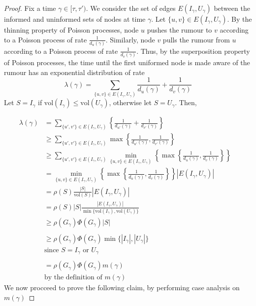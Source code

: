 \begin{proof}
	Fix a time $\gamma \in [\tau, \tau')$. 
	We consider the set of edges $E(I_\gamma, U_\gamma)$ between the informed and uninformed sets of nodes at time $\gamma$. 
	Let $\{u, v\} \in E(I_\gamma, U_\gamma)$. By the thinning property of Poisson processes, node $u$ pushes the rumour to $v$ according to a Poisson process of rate $\frac{1}{d_u(\gamma)}$. Similarly, node $v$ pulls the rumour from $u$ according to a Poisson process of rate $\frac{1}{d_v(\gamma)}$. %
	Thus, by the superposition property of Poisson processes, the time until the first uniformed node is made aware of the rumour has an exponential distribution of rate %
	$$
		\lambda(\gamma) = \sum_{\{u, v\} \in E(I_\gamma, U_\gamma)} \frac{1}{d_u(\gamma)} + \frac{1}{d_v(\gamma)}
	$$
	Let $S = I_\gamma$ if $\text{vol}(I_\gamma) \leq \text{vol}(U_\gamma)$, otherwise let $S = U_\gamma$. Then,

	\begin{align*}
		\lambda(\gamma) &= \sum_{\{u', v'\} \in E(I_\gamma, U_\gamma)} \left\{ \frac{1}{d_{u'}(\gamma)} + \frac{1}{d_{v'}(\gamma)} \right\}\\
		& \geq \sum_{\{u', v'\} \in E(I_\gamma, U_\gamma)}  \max \left\{ \frac{1}{d_{u'}(\gamma)},\frac{1}{d_{v'}(\gamma)} \right\} \\ 
		& \geq \sum_{\{u', v'\} \in E(I_\gamma, U_\gamma)} \min_{\{u, v\} \in E(I_\gamma, U_\gamma) } \left\{ \max \left\{ \frac{1}{d_u(\gamma)},\frac{1}{d_v(\gamma)} \right\} \right\} & \\ 
		& = \min_{\{u, v\} \in E(I_\gamma, U_\gamma) } 
		\left\{ \max \left\{ \frac{1}{d_u(\gamma)},\frac{1}{d_v(\gamma)} \right\} \right\} |E(I_\gamma, U_\gamma)| \\
		& = \rho(S) \frac{|S|}{\text{vol}(S)} |E(I_\gamma, U_\gamma)| \\
		& = \rho(S) |S| \frac{|E(I_\gamma, U_\gamma)|}{ 
			\min\{\text{vol}(I_\gamma), \text{vol}(U_\gamma)\}
		} \\
		& \geq \rho(G_\gamma)\Phi(G_\gamma)|S| \\ 
		& \\
		& \geq \rho(G_\gamma)\Phi(G_\gamma) \min\{|I_\gamma|, |U_\gamma|\} \\
		& \text{since } S = I_\gamma \text { or } U_\gamma \\
		& \\
		& = \rho(G_\gamma)\Phi(G_\gamma) m(\gamma) \\
		& \text{by the definition of } m(\gamma)
	\end{align*}
	We now procceed to prove the following claim, by performing case analysis on $m(\gamma)$


\end{proof}
